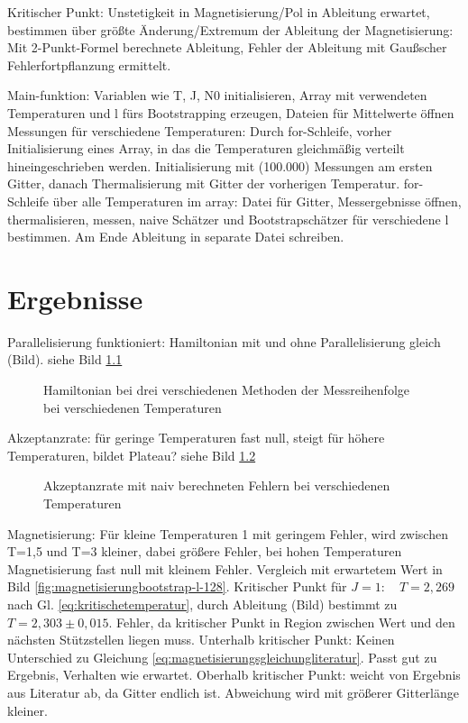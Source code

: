 \documentclass{scrreprt}
\begin{document}
	Kritischer Punkt: Unstetigkeit in Magnetisierung/Pol in Ableitung erwartet, bestimmen über größte Änderung/Extremum der Ableitung der Magnetisierung: Mit 2-Punkt-Formel berechnete Ableitung, Fehler der Ableitung mit Gaußscher Fehlerfortpflanzung ermittelt.
	
	
	Main-funktion: Variablen wie T, J, N0 initialisieren, Array mit verwendeten Temperaturen und l fürs Bootstrapping erzeugen, Dateien für Mittelwerte öffnen
	Messungen für verschiedene Temperaturen: Durch for-Schleife, vorher Initialisierung eines Array, in das die Temperaturen gleichmäßig verteilt hineingeschrieben werden.
	Initialisierung mit (100.000) Messungen am ersten Gitter, danach Thermalisierung mit Gitter der vorherigen Temperatur.
	for-Schleife über alle Temperaturen im array: Datei für Gitter, Messergebnisse öffnen, thermalisieren, messen, naive Schätzer und Bootstrapschätzer für verschiedene l bestimmen.
	Am Ende Ableitung in separate Datei schreiben.
	
	
	 	
	\chapter{Ergebnisse}
	Parallelisierung funktioniert: Hamiltonian mit und ohne Parallelisierung gleich (Bild). siehe Bild \ref{fig:vergleichham}
	
	\begin{figure}[htbp]
		
		\label{fig:vergleichham}
		\caption{Hamiltonian bei drei verschiedenen Methoden der Messreihenfolge bei verschiedenen Temperaturen}
	\end{figure}
	Akzeptanzrate: für geringe Temperaturen fast null, steigt für höhere Temperaturen, bildet Plateau? siehe Bild \ref{fig:akzeptanzratenaiv}
	
	\begin{figure}[htbp]
		
		\label{fig:akzeptanzratenaiv}
		\caption{Akzeptanzrate mit naiv berechneten Fehlern bei verschiedenen Temperaturen}
	\end{figure}
	
	Magnetisierung: Für kleine Temperaturen 1 mit geringem Fehler, wird zwischen T=1,5 und T=3 kleiner, dabei größere Fehler, bei hohen Temperaturen Magnetisierung fast null mit kleinem Fehler. Vergleich mit erwartetem Wert in Bild \ref{fig:magnetisierungbootstrap-l-128}.
	Kritischer Punkt für ${J=1:}\quad {T=2,269}$ nach Gl. \ref{eq:kritischetemperatur}, durch Ableitung (Bild) bestimmt zu $T=2,303\pm0,015$. Fehler, da kritischer Punkt in Region zwischen Wert und den nächsten Stützstellen liegen muss.
	Unterhalb kritischer Punkt: Keinen Unterschied zu Gleichung \ref{eq:magnetisierungsgleichungliteratur}. Passt gut zu Ergebnis, Verhalten wie erwartet.
	Oberhalb kritischer Punkt: weicht von Ergebnis aus Literatur ab, da Gitter endlich ist. Abweichung wird mit größerer Gitterlänge kleiner.
	
\end{document}
